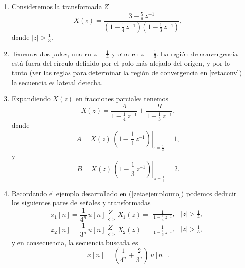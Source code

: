 \begin{enumerate}

\item Consideremos la transformada $Z$
\begin{equation}
  X(z) = 
 \frac{3 - \frac{5}{6} \, z^{-1}}{\left( 1 - \frac{1}{4} \, z^{-1} \right) \left(1 - \frac{1}{3} \, z^{-1} \right)},
\end{equation}
donde $| z | > \frac{1}{3}$.

\item Tenemos dos polos, uno en $z = \frac{1}{4}$ y otro en $z = \frac{1}{3}$. La regi\'{o}n de 
convergencia est\'{a} fuera del c\'{i}rculo definido por el polo m\'{a}s alejado del origen, y por
lo tanto (ver las reglas para determinar la regi\'{o}n de convergencia en \ref{zetaconv}) 
la secuencia es lateral derecha.

\item Expandiendo $X(z)$ en fracciones parciales tenemos
\begin{equation}
  X(z) = \frac{A}{1-\frac{1}{4} \, z^{-1}} +  \frac{B}{1-\frac{1}{3} \, z^{-1}},
\end{equation}
donde
\begin{equation}
  A = \left. X(z) \, (1-\frac{1}{4} \, z^{-1}) \right|_{z=\frac{1}{4}} = 1,
\end{equation}
y
\begin{equation}
  B = \left. X(z) \, (1-\frac{1}{3} \, z^{-1}) \right|_{z=\frac{1}{3}} = 2.
\end{equation}

\item Recordando el ejemplo desarrollado en (\ref{zetaejemplouno}) podemos deducir los siguientes pares de 
se\~{n}ales y transformadas
\begin{equation}
  x_{1}[n] = \frac{1}{4^{n}} \, u[n] 
    \begin{array}{c} Z \\ \Leftrightarrow \end{array}
  X_{1}(z) = \begin{array}{cc} \frac{1}{1-\frac{1}{4} \, z^{-1}}, & |z| > \frac{1}{4}, \end{array}
\end{equation}
\begin{equation}
  x_{2}[n] = \frac{1}{3^{n}} \, u[n] 
    \begin{array}{c} Z \\ \Leftrightarrow \end{array}
  X_{2}(z) = \begin{array}{cc} \frac{1}{1-\frac{1}{3} \, z^{-1}}, & |z| > \frac{1}{3}, \end{array}
\end{equation}
y en consecuencia, la secuencia buscada es
\begin{equation}
  x[n] = \left( \frac{1}{4^{n}} + \frac{2}{3^{n}} \right) \, u[n].
\end{equation}

\end{enumerate}

